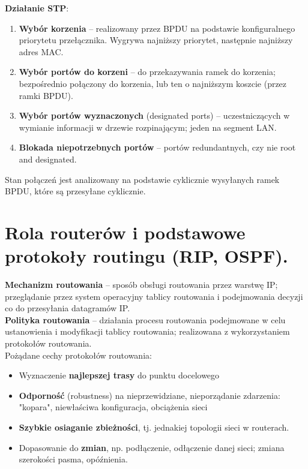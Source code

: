 \documentclass[main.tex]{subfiles}
\begin{document}
    \noindent\textbf{Działanie STP}:
    \begin{enumerate}[noitemsep]
        \item \textbf{Wybór korzenia} -- realizowany przez BPDU na podstawie konfiguralnego priorytetu przełącznika.
        Wygrywa najniższy priorytet, następnie najniższy adres MAC.

        \item \textbf{Wybór portów do korzeni} -- do przekazywania ramek do korzenia; bezpośrednio
        połączony do korzenia, lub ten o najniższym koszcie (przez ramki BPDU).

        \item \textbf{Wybór portów wyznaczonych} (designated ports) -- uczestniczących w wymianie informacji w drzewie
        rozpinającym; jeden na segment LAN.

        \item \textbf{Blokada niepotrzebnych portów} -- portów redundantnych, czy nie root and designated.
    \end{enumerate}
    Stan połączeń jest analizowany na podstawie cyklicznie wysyłanych ramek BPDU, które są przesyłane cyklicznie.


    \section{Rola routerów i podstawowe protokoły routingu (RIP, OSPF).}

    \textbf{Mechanizm routowania} -- sposób obsługi routowania przez warstwę IP; przeglądanie przez system operacyjny
    tablicy routowania i podejmowania decyzji co do przesyłania datagramów IP.\\

    \noindent \textbf{Polityka routowania} -- działania procesu routowania podejmowane w celu ustanowienia i modyfikacji
    tablicy routowania; realizowana z wykorzystaniem protokołów routowania.\\

    \noindent Pożądane cechy protokołów routowania:
    \begin{itemize}[noitemsep]
        \item Wyznaczenie \textbf{najlepszej trasy} do punktu docelowego
        \item \textbf{Odporność} (robustness) na nieprzewidziane, nieporządanie zdarzenia:
        "kopara", niewłaściwa konfiguracja, obciążenia sieci
        \item \textbf{Szybkie osiaganie zbieżności}, tj. jednakiej topologii sieci w routerach.
        \item Dopasowanie do \textbf{zmian}, np. podłączenie, odłączenie danej sieci; zmiana szerokości pasma, opóźnienia.
    \end{itemize}
\end{document}
